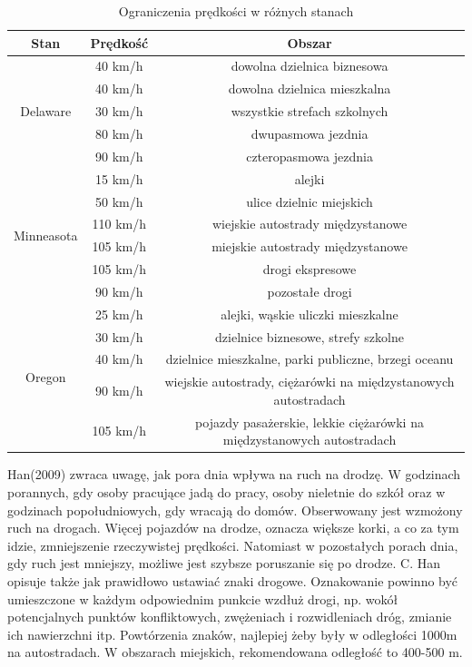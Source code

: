 \begin{table}[ht]
\centering
\caption{Ograniczenia prędkości w różnych stanach}
\label{ograniczeniaStany}
\begin{tabular}{|c|c|c|}
\hline
\textbf{Stan}                    & \textbf{Prędkość} & \textbf{Obszar} \\ \hline
\multirow{5}{*}{Delaware}   & 40 km/h & dowolna dzielnica biznesowa \\ \cline{2-3}
& 40 km/h & dowolna dzielnica mieszkalna \\ \cline{2-3}
& 30 km/h & wszystkie strefach szkolnych \\ \cline{2-3}
& 80 km/h & dwupasmowa jezdnia \\ \cline{2-3}
& 90 km/h & czteropasmowa jezdnia \\ \hline

\multirow{6}{*}{Minneasota}   & 15 km/h & alejki \\ \cline{2-3}
& 50 km/h & ulice dzielnic miejskich \\ \cline{2-3}
& 110 km/h & wiejskie autostrady międzystanowe \\ \cline{2-3}
& 105 km/h & miejskie autostrady międzystanowe \\ \cline{2-3}
& 105 km/h & drogi ekspresowe \\ \cline{2-3}
& 90 km/h & pozostałe drogi \\ \hline

\multirow{5}{*}{Oregon}   & 25 km/h & alejki, wąskie uliczki mieszkalne  \\ \cline{2-3}
& 30 km/h & dzielnice biznesowe, strefy szkolne \\ \cline{2-3}
& 40 km/h & dzielnice mieszkalne, parki publiczne, brzegi oceanu \\ \cline{2-3}
& 90 km/h & wiejskie autostrady, ciężarówki na międzystanowych autostradach \\ \cline{2-3}
& 105 km/h & pojazdy pasażerskie, lekkie ciężarówki na międzystanowych autostradach\\ \hline
\end{tabular}
\end{table}


Han(2009) zwraca uwagę, jak pora dnia wpływa na ruch na drodzę. W godzinach porannych, gdy osoby pracujące jadą do pracy, osoby nieletnie do szkół oraz w godzinach popołudniowych, gdy wracają do domów. Obserwowany jest wzmożony ruch na drogach. Więcej pojazdów na drodze, oznacza większe korki, a co za tym idzie, zmniejszenie rzeczywistej prędkości. Natomiast w pozostałych porach dnia, gdy ruch jest mniejszy, możliwe jest szybsze poruszanie się po drodze. C. Han opisuje także jak prawidłowo ustawiać znaki drogowe. Oznakowanie powinno być umieszczone w każdym odpowiednim punkcie wzdłuż drogi, np. wokół potencjalnych punktów konfliktowych, zwężeniach i rozwidleniach dróg, zmianie ich nawierzchni itp. Powtórzenia znaków, najlepiej żeby były w odległości 1000m na autostradach. W obszarach miejskich, rekomendowana odległość to 400-500 m.

